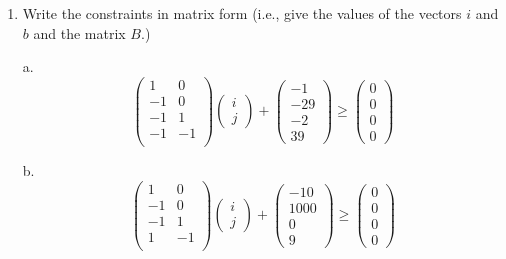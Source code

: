 \documentclass[11pt]{article}
\begin{document}
\begin{enumerate}
\begin{Answer}
\begin{figure}[H]
		\end{figure}
		\end{Answer}
		\newpage
	\item Write the constraints in matrix form (i.e., give the values of the vectors $i$ and $b$ and the matrix $B$.)
		\begin{Answer}
		a.
		$$
		\begin{pmatrix}
		1 & 0  \\
		-1 & 0  \\
		-1 & 1 \\
		-1 & -1 \\
		\end{pmatrix}
		\begin{pmatrix}
		i \\
		j 
		\end{pmatrix}
		+
		\begin{pmatrix}
		-1 \\
		-29 \\
		-2 \\
		39
		\end{pmatrix}
		\ge
		\begin{pmatrix}
		0 \\
		0 \\
		0 \\
		0
		\end{pmatrix}
		$$
		
		b.
		$$
		\begin{pmatrix}
		1 & 0  \\
		-1 & 0  \\
		-1 & 1 \\
		1 & -1 \\
		\end{pmatrix}
		\begin{pmatrix}
		i \\
		j 
		\end{pmatrix}
		+
		\begin{pmatrix}
		-10 \\
		1000 \\
		0 \\
		9
		\end{pmatrix}
		\ge
		\begin{pmatrix}
		0 \\
		0 \\
		0 \\
		0
		\end{pmatrix}
		$$
		

\end{Answer}
\end{enumerate}
\end{document}
